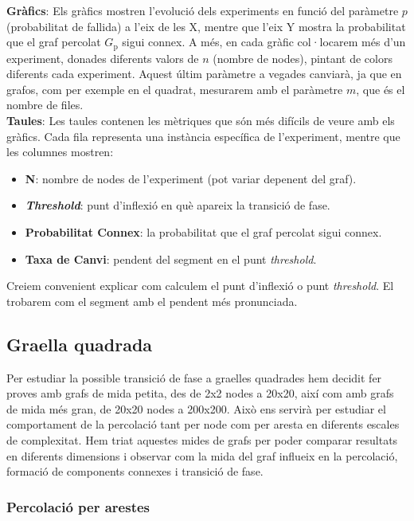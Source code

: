 \documentclass[a4paper]{article}
\begin{document}
	\textbf{Gràfics}: Els gràfics mostren l'evolució dels experiments en funció del paràmetre $p$ (probabilitat de fallida) a l'eix de les X, mentre que l'eix Y mostra la probabilitat que el graf percolat $G_{\text{p}}$ sigui connex. A més, en cada gràfic col·locarem més d'un experiment, donades diferents valors de $n$ (nombre de nodes), pintant de colors diferents cada experiment. Aquest últim paràmetre a vegades canviarà, ja que en grafos, com per exemple en el quadrat, mesurarem amb el paràmetre $m$, que és el nombre de files. \\
	
	\textbf{Taules}: Les taules contenen les mètriques que són més difícils de veure amb els gràfics. Cada fila representa una instància específica de l'experiment, mentre que les columnes mostren:
	
	\begin{itemize}
		\item \textbf{N}: nombre de nodes de l'experiment (pot variar depenent del graf).
		\item \textbf{\textit{Threshold}}: punt d'inflexió en què apareix la transició de fase.
		\item \textbf{Probabilitat Connex}: la probabilitat que el graf percolat sigui connex.
		\item \textbf{Taxa de Canvi}: pendent del segment en el punt \textit{threshold}.
	\end{itemize}
	
	Creiem convenient explicar com calculem el punt d'inflexió o punt \textit{threshold}. El trobarem com el segment amb el pendent més pronunciada.
	
	\subsection{Graella quadrada}
	
	Per estudiar la possible transició de fase a graelles quadrades hem decidit fer proves amb grafs de mida petita, des de 2x2 nodes a 20x20, així com amb grafs de mida més gran, de 20x20 nodes a 200x200. Això ens servirà per estudiar el comportament de la percolació tant per node com per aresta en diferents escales de complexitat. Hem triat aquestes mides de grafs per poder comparar resultats en diferents dimensions i observar com la mida del graf influeix en la percolació, formació de components connexes i transició de fase. \\
	
	\subsubsection{Percolació per arestes}
	
\end{document}
